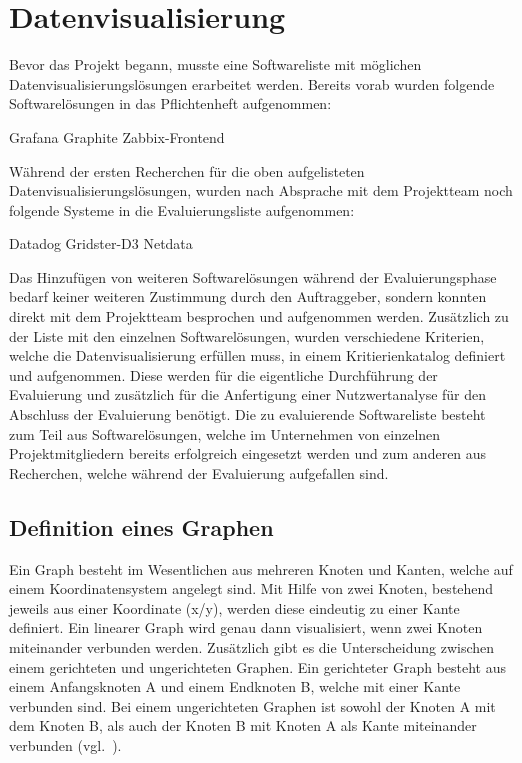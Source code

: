{\section{Datenvisualisierung}
\label{sec:datenvisualisierung}
Bevor das Projekt begann, musste eine Softwareliste mit möglichen
Datenvisualisierungslösungen erarbeitet werden. Bereits vorab wurden folgende
Softwarelösungen in das Pflichtenheft aufgenommen:

\begin{outline}
  \1 Grafana
  \1 Graphite
  \1 Zabbix\hyp{}Frontend
\end{outline}

Während der ersten Recherchen für die oben aufgelisteten
Datenvisualisierungslösungen, wurden nach Absprache mit dem Projektteam noch
folgende Systeme in die Evaluierungsliste aufgenommen:

\begin{outline}
  \1 Datadog
  \1 Gridster\hyp{}D3
  \1 Netdata
\end{outline}

Das Hinzufügen von weiteren Softwarelösungen während der Evaluierungsphase
bedarf keiner weiteren Zustimmung durch den Auftraggeber, sondern konnten
direkt mit dem Projektteam besprochen und aufgenommen werden. Zusätzlich zu der
Liste mit den einzelnen Softwarelösungen, wurden verschiedene Kriterien, welche
die Datenvisualisierung erfüllen muss, in einem Kritierienkatalog definiert und
aufgenommen. Diese werden für die eigentliche Durchführung der Evaluierung und
zusätzlich für die Anfertigung einer Nutzwertanalyse für den Abschluss der
Evaluierung benötigt. Die zu evaluierende Softwareliste besteht zum Teil aus
Softwarelösungen, welche im Unternehmen von einzelnen Projektmitgliedern
bereits erfolgreich eingesetzt werden und zum anderen aus Recherchen, welche
während der Evaluierung aufgefallen sind.
\mr%

\subsection{Definition eines Graphen}
\label{subsec:definition_eines_graphen}
Ein Graph besteht im Wesentlichen aus mehreren Knoten und Kanten, welche auf
einem Koordinatensystem angelegt sind. Mit Hilfe von zwei Knoten, bestehend
jeweils aus einer Koordinate (x/y), werden diese eindeutig zu einer Kante
definiert. Ein linearer Graph wird genau dann visualisiert, wenn zwei Knoten
miteinander verbunden werden. Zusätzlich gibt es die Unterscheidung zwischen
einem gerichteten und ungerichteten Graphen. Ein gerichteter Graph besteht aus
einem Anfangsknoten A und einem Endknoten B, welche mit einer Kante verbunden
sind. Bei einem ungerichteten Graphen ist sowohl der Knoten A mit dem Knoten B,
als auch der Knoten B mit Knoten A als Kante miteinander
verbunden (vgl.~\cite{kaiser2008c}).

}
